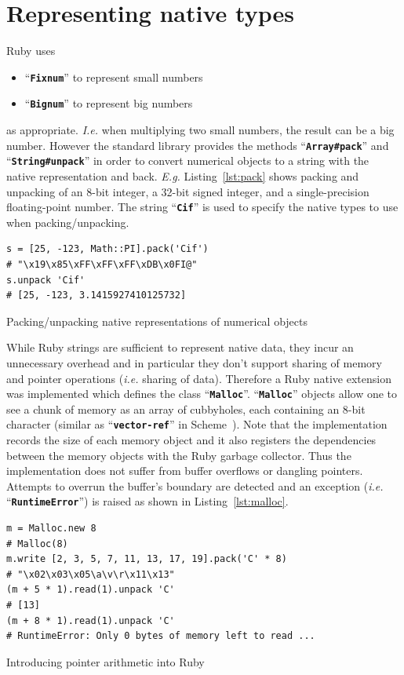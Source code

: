 \documentclass[10pt,journal,compsoc]{joser1}
\newcommand{\code}[1]{``\texttt{\textbf{\textcolor{codegray}{\small{#1}}}}''}
\newcommand{\lst}[1]{Listing~\ref{lst:#1}}
\begin{document}
\section{Representing native types}
Ruby uses
\begin{itemize}
  \item \code{Fixnum} to represent small numbers
  \item \code{Bignum} to represent big numbers
\end{itemize}
as appropriate.  \emph{I.e.} when multiplying two small numbers, the result can
be a big number. However the standard library provides the methods
\code{Array\#pack} and \code{String\#unpack} in order to convert numerical
objects to a string with the native representation and back. \emph{E.g.}
\lst{pack} shows packing and unpacking of an 8-bit integer, a 32-bit signed
integer, and a single-precision floating-point number. The string \code{Cif} is
used to specify the native types to use when packing/unpacking.
\begin{listing}[htbp]
  \begin{verbatim}
s = [25, -123, Math::PI].pack('Cif')
# "\x19\x85\xFF\xFF\xFF\xDB\x0FI@"
s.unpack 'Cif'
# [25, -123, 3.1415927410125732]
  \end{verbatim}
  \caption{Packing/unpacking native representations of numerical
  objects\label{lst:pack}}
\end{listing}

While Ruby strings are sufficient to represent native data, they incur an
unnecessary overhead and in particular they don't support sharing of memory and
pointer operations (\emph{i.e.} sharing of data). Therefore a Ruby native
extension was implemented which defines the class \code{Malloc}. \code{Malloc}
objects allow one to see a chunk of memory as an array of cubbyholes, each
containing an 8-bit character (similar as \code{vector-ref} in
Scheme~\citep{abelson1996structure})\citep{thesis_wedekind}. Note that the
implementation records the size of each memory object and it also registers the
dependencies between the memory objects with the Ruby garbage collector. Thus
the implementation does not suffer from buffer overflows or dangling pointers.
Attempts to overrun the buffer's boundary are detected and an exception
(\emph{i.e.} \code{RuntimeError}) is raised as shown in \lst{malloc}.
\begin{listing}[htbp]
  \begin{verbatim}
m = Malloc.new 8
# Malloc(8)
m.write [2, 3, 5, 7, 11, 13, 17, 19].pack('C' * 8)
# "\x02\x03\x05\a\v\r\x11\x13"
(m + 5 * 1).read(1).unpack 'C'
# [13]
(m + 8 * 1).read(1).unpack 'C'
# RuntimeError: Only 0 bytes of memory left to read ...
  \end{verbatim}
  \caption{Introducing pointer arithmetic into Ruby\label{lst:malloc}}
\end{listing}
\end{document}

